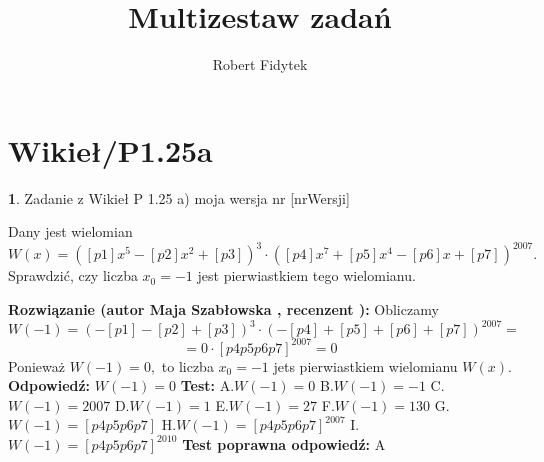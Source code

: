 \documentclass[12pt, a4paper]{article}
\title{Multizestaw zadań}
\author{Robert Fidytek}
\date{}
\theoremstyle{definition} %
\newtheorem{zad}{}
\newcommand{\kategoria}[1]{\section{#1}} %
\newcommand{\zadStart}[1]{\begin{zad}#1\newline} %
\newcommand{\zadStop}{\end{zad}}   %
\newcommand{\rozwStart}[2]{\noindent \textbf{Rozwiązanie (autor #1 , recenzent #2): }\newline} %
\newcommand{\rozwStop}{\newline}                                            %
\newcommand{\odpStart}{\noindent \textbf{Odpowiedź:}\newline}    %
\newcommand{\odpStop}{\newline}                                             %
\newcommand{\testStart}{\noindent \textbf{Test:}\newline} %
\newcommand{\testStop}{\newline} %
\newcommand{\kluczStart}{\noindent \textbf{Test poprawna odpowiedź:}\newline} %
\newcommand{\kluczStop}{\newline} %
\begin{document}
\maketitle


\kategoria{Wikieł/P1.25a}
\zadStart{Zadanie z Wikieł P 1.25 a)  moja wersja nr [nrWersji]}


Dany jest wielomian $W(x)=([p1]x^{5}-[p2]x^{2}+[p3])^{3}\cdot([p4]x^{7}+[p5]x^{4}-[p6]x+[p7])^{2007}.$ Sprawdzić, czy liczba $x_{0}=-1$ jest pierwiastkiem tego wielomianu.
\zadStop
\rozwStart{Maja Szabłowska}{}
Obliczamy
$$W(-1)=(-[p1]-[p2]+[p3])^{3}\cdot(-[p4]+[p5]+[p6]+[p7])^{2007}=$$
$$=0\cdot[p4p5p6p7]^{2007}=0 $$
Ponieważ $W(-1)=0,$ to liczba $x_{0}=-1$ jets pierwiastkiem wielomianu $W(x).$
\rozwStop
\odpStart
$W(-1)=0$
\odpStop
\testStart
A.$W(-1)=0$
B.$W(-1)=-1$
C.$W(-1)=2007$
D.$W(-1)=1$
E.$W(-1)=27$
F.$W(-1)=130$
G.$W(-1)=[p4p5p6p7]$
H.$W(-1)=[p4p5p6p7]^{2007}$
I.$W(-1)=[p4p5p6p7]^{2010}$
\testStop
\kluczStart
A
\kluczStop
\end{document}
